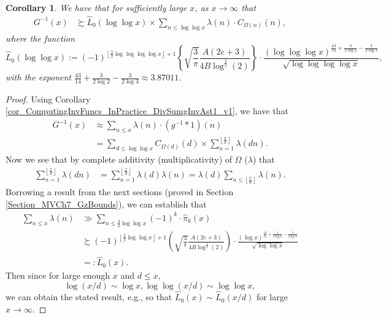 \documentclass[11pt,reqno,a4letter]{article}
\numberwithin{figure}{section}
\numberwithin{table}{section}
\newcommand{\floor}[1]{\left\lfloor #1 \right\rfloor}
\newcommand{\Floor}[2]{\ensuremath{\left\lfloor \frac{#1}{#2} \right\rfloor}}
\theoremstyle{plain}
\newtheorem{cor}[theorem]{Corollary}
\numberwithin{theorem}{section}
\theoremstyle{definition}
\begin{document}
\begin{cor} 
\label{cor_ASemiForm_ForGInvx_v1} 
We have that for sufficiently large $x$, as $x \rightarrow \infty$ that 
\begin{align*} 
G^{-1}(x) & \succsim \widehat{L}_0(\log\log x) \times \sum_{n \leq \log\log x} 
     \lambda(n) \cdot C_{\Omega(n)}(n), 
\end{align*} 
where the function 
\[
\widehat{L}_0(\log\log x) := (-1)^{\floor{\frac{3}{2} \log\log\log\log x} + 1} \left\{ 
     \sqrt{\frac{3}{\pi}} \frac{A (2e+3)}{4B \log^{\frac{3}{2}}(2)}\right\} \cdot 
     \frac{(\log\log\log x)^{\frac{43}{14} + \frac{3}{2 \log 2} - \frac{3}{2 \log 3}}}{ 
     \sqrt{\log\log\log\log x}}, 
\]
with the exponent $\frac{43}{14} + \frac{3}{2 \log 2} - \frac{3}{2 \log 3} \approx 3.87011$. 
\end{cor} 
\begin{proof} 
Using Corollary \ref{cor_ComputingInvFuncs_InPractice_DivSumgInvAst1_v1}, we have that 
\begin{align*} 
G^{-1}(x) & \approx \sum_{n \leq x} \lambda(n) \cdot (g^{-1} \ast 1)(n) \\ 
     & = \sum_{d \leq \log\log x} C_{\Omega(d)}(d) \times \sum_{n=1}^{\Floor{x}{d}} \lambda(dn). 
\end{align*} 
Now we see that by complete additivity (multiplicativity) of $\Omega$ ($\lambda$) that 
\begin{align*} 
\sum_{n=1}^{\Floor{x}{d}} \lambda(dn) & = \sum_{n=1}^{\Floor{x}{d}} \lambda(d) \lambda(n) 
     = \lambda(d) \sum_{n \leq \Floor{x}{d}} \lambda(n). 
\end{align*} 
Borrowing a result from the next sections 
(proved in Section \ref{Section_MVCh7_GzBounds}), 
we can establish that 
\begin{align*} 
\sum_{n \leq x} \lambda(n) & \gg \sum_{n \leq \frac{3}{2} \log\log x} (-1)^k \cdot \widehat{\pi}_k(x) \\ 
     & \succsim (-1)^{\floor{\frac{3}{2} \log\log x} + 1} \left( 
     \sqrt{\frac{3}{\pi}} \frac{A (2e+3)}{4B \log^{\frac{3}{2}}(2)}\right) \cdot 
     \frac{(\log x)^{\frac{43}{14} + \frac{3}{2 \log 2} - \frac{3}{2 \log 3}}}{ 
     \sqrt{\log\log x}} \\ 
     & =: \widehat{L}_0(x). 
\end{align*} 
Then since for large enough $x$ and $d \leq x$, 
\[
\log(x/d) \sim \log x, \log\log(x/d) \sim \log\log x, 
\] 
we can obtain the stated result, e.g., so that 
$\widehat{L}_0(x) \sim \widehat{L}_0(x/d)$ for large $x \rightarrow \infty$. 
\end{proof} 
\end{document}
